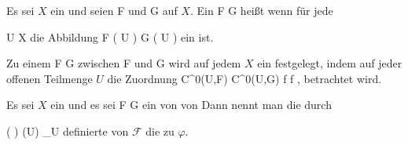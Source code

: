 {}
{





Es sei $X$ ein
und seien
\mathkor {} {{ \mathcal  F   }} {und} {{ \mathcal  G   }} {}
auf $X$. Ein
\maabb {\varphi} { { \mathcal  F   } } { { \mathcal  G   }
} {}
heißt
wenn für jede

\mavergleichskette
{\vergleichskette
{U
}
{ \subseteq }{ X
}
{  }{
}
{    }{
}
{   }{
}
}
{}{}{}
die Abbildung
 { { \mathcal  F   }  \left(   U   \right) } { { \mathcal  G   }  \left(   U   \right)
} {}
ein
ist.





}

{





Zu einem
\maabb {\varphi} { F } { G
} {}
zwischen
\mathkor {} {F} {und} {G} {}
wird auf jedem
$X$ ein
festgelegt, indem auf jeder offenen Teilmenge $U$ die Zuordnung
\maabbeledisp {} {C^0(U,F) } { C^0(U,G)
} { f } { \varphi \circ f
} {,}
betrachtet wird.





}


{}
{





Es sei $X$ ein
und es sei
\maabb {\varphi} { { \mathcal  F   } } { { \mathcal  G   }
} {}
ein
von
von
Dann nennt man die durch

\mavergleichskettedisp
{\vergleichskette
{ \left(   \varphi  \right) (U)
}
{ } {  \varphi_U
}
{ } {
}
{ } {
}
{ } {
}
}
{}{}{}
definierte
von ${ \mathcal  F   }$
die
zu $\varphi$.





}

